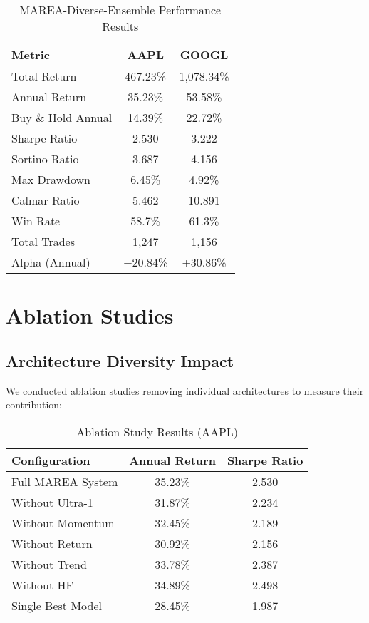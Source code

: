 \documentclass[10pt,twocolumn]{article}
\begin{document}
\begin{table}[!htb]
\centering
\caption{MAREA-Diverse-Ensemble Performance Results}
\label{tab:performance}
\vspace{0.1cm}
\begin{tabular}{@{}lcc@{}}
\toprule
\textbf{Metric} & \textbf{AAPL} & \textbf{GOOGL} \\
\midrule
Total Return & 467.23\% & 1,078.34\% \\
Annual Return & 35.23\% & 53.58\% \\
Buy \& Hold Annual & 14.39\% & 22.72\% \\
Sharpe Ratio & 2.530 & 3.222 \\
Sortino Ratio & 3.687 & 4.156 \\
Max Drawdown & 6.45\% & 4.92\% \\
Calmar Ratio & 5.462 & 10.891 \\
Win Rate & 58.7\% & 61.3\% \\
Total Trades & 1,247 & 1,156 \\
Alpha (Annual) & +20.84\% & +30.86\% \\
\bottomrule
\end{tabular}
\vspace{0.1cm}
\end{table}

\section{Ablation Studies}

\subsection{Architecture Diversity Impact}

We conducted ablation studies removing individual architectures to measure their contribution:

\begin{table}[!htb]
\centering
\caption{Ablation Study Results (AAPL)}
\label{tab:ablation}
\vspace{0.1cm}
\begin{tabular}{@{}lcc@{}}
\toprule
\textbf{Configuration} & \textbf{Annual Return} & \textbf{Sharpe Ratio} \\
\midrule
Full MAREA System & 35.23\% & 2.530 \\
Without Ultra-1 & 31.87\% & 2.234 \\
Without Momentum & 32.45\% & 2.189 \\
Without Return & 30.92\% & 2.156 \\
Without Trend & 33.78\% & 2.387 \\
Without HF & 34.89\% & 2.498 \\
Single Best Model & 28.45\% & 1.987 \\
\bottomrule
\end{tabular}
\vspace{0.1cm}
\end{table}
\end{document}
